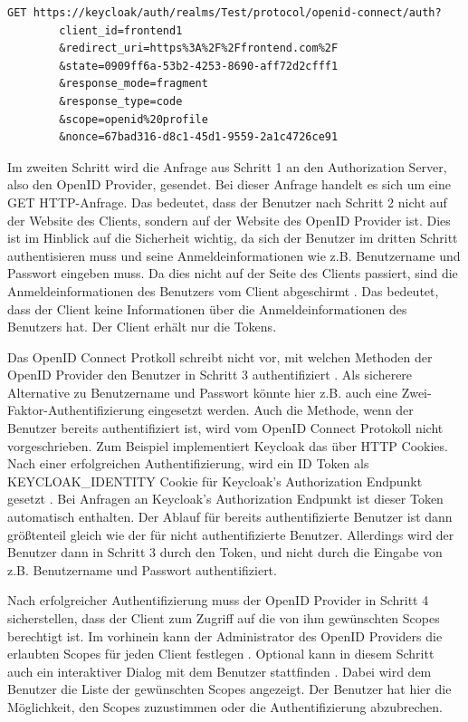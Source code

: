 \begin{lstlisting}[caption=Beispiel Autorization Request, captionpos=b, label=EBAutorizationRequest]
GET https://keycloak/auth/realms/Test/protocol/openid-connect/auth?
        client_id=frontend1
        &redirect_uri=https%3A%2F%2Ffrontend.com%2F
        &state=0909ff6a-53b2-4253-8690-aff72d2cfff1
        &response_mode=fragment
        &response_type=code
        &scope=openid%20profile
        &nonce=67bad316-d8c1-45d1-9559-2a1c4726ce91
\end{lstlisting}

Im zweiten Schritt wird die Anfrage aus Schritt 1 an den Authorization Server, also den OpenID Provider, gesendet. Bei dieser Anfrage handelt es sich um eine GET HTTP-Anfrage. Das bedeutet, dass der Benutzer nach Schritt 2 nicht auf der Website des Clients, sondern auf der Website des OpenID Provider ist. Dies ist im Hinblick auf die Sicherheit wichtig, da sich der Benutzer im dritten Schritt authentisieren muss und seine Anmeldeinformationen wie z.B. Benutzername und Passwort eingeben muss. Da dies nicht auf der Seite des Clients passiert, sind die Anmeldeinformationen des Benutzers vom Client abgeschirmt \cite{EB15}. Das bedeutet, dass der Client keine Informationen über die Anmeldeinformationen des Benutzers hat. Der Client erhält nur die Tokens.

Das OpenID Connect Protkoll schreibt nicht vor, mit welchen Methoden der OpenID Provider den Benutzer in Schritt 3 authentifiziert \cite{EB16}. Als sicherere Alternative zu Benutzername und Passwort könnte hier z.B. auch eine Zwei-Faktor-Authentifizierung eingesetzt werden. Auch die Methode, wenn der Benutzer bereits authentifiziert ist, wird vom OpenID Connect Protokoll nicht vorgeschrieben. Zum Beispiel implementiert Keycloak das über HTTP Cookies. Nach einer erfolgreichen Authentifizierung, wird ein ID Token als KEYCLOAK\_IDENTITY Cookie für Keycloak's Authorization Endpunkt gesetzt \cite{EB17}. Bei Anfragen an Keycloak's Authorization Endpunkt ist dieser Token automatisch enthalten. Der Ablauf für bereits authentifizierte Benutzer ist dann größtenteil gleich wie der für nicht authentifizierte Benutzer. Allerdings wird der Benutzer dann in Schritt 3 durch den Token, und nicht durch die Eingabe von z.B. Benutzername und Passwort authentifiziert.

Nach erfolgreicher Authentifizierung muss der OpenID Provider in Schritt 4 sicherstellen, dass der Client zum Zugriff auf die von ihm gewünschten Scopes berechtigt ist. Im vorhinein kann der Administrator des OpenID Providers die erlaubten Scopes für jeden Client festlegen \cite{EB68}. Optional kann in diesem Schritt auch ein interaktiver Dialog mit dem Benutzer stattfinden \cite{EB18}. Dabei wird dem Benutzer die Liste der gewünschten Scopes angezeigt. Der Benutzer hat hier die Möglichkeit, den Scopes zuzustimmen oder die Authentifizierung abzubrechen.

